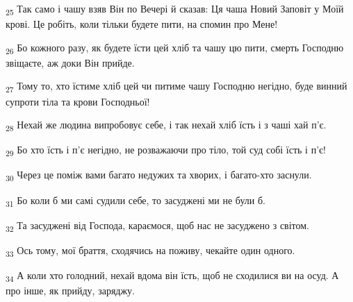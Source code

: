 \begin{tcolorbox}
\textsubscript{25} Так само і чашу взяв Він по Вечері й сказав: Ця чаша Новий Заповіт у Моїй крові. Це робіть, коли тільки будете пити, на спомин про Мене!
\end{tcolorbox}
\begin{tcolorbox}
\textsubscript{26} Бо кожного разу, як будете їсти цей хліб та чашу цю пити, смерть Господню звіщаєте, аж доки Він прийде.
\end{tcolorbox}
\begin{tcolorbox}
\textsubscript{27} Тому то, хто їстиме хліб цей чи питиме чашу Господню негідно, буде винний супроти тіла та крови Господньої!
\end{tcolorbox}
\begin{tcolorbox}
\textsubscript{28} Нехай же людина випробовує себе, і так нехай хліб їсть і з чаші хай п'є.
\end{tcolorbox}
\begin{tcolorbox}
\textsubscript{29} Бо хто їсть і п'є негідно, не розважаючи про тіло, той суд собі їсть і п'є!
\end{tcolorbox}
\begin{tcolorbox}
\textsubscript{30} Через це поміж вами багато недужих та хворих, і багато-хто заснули.
\end{tcolorbox}
\begin{tcolorbox}
\textsubscript{31} Бо коли б ми самі судили себе, то засуджені ми не були б.
\end{tcolorbox}
\begin{tcolorbox}
\textsubscript{32} Та засуджені від Господа, караємося, щоб нас не засуджено з світом.
\end{tcolorbox}
\begin{tcolorbox}
\textsubscript{33} Ось тому, мої браття, сходячись на поживу, чекайте один одного.
\end{tcolorbox}
\begin{tcolorbox}
\textsubscript{34} А коли хто голодний, нехай вдома він їсть, щоб не сходилися ви на осуд. А про інше, як прийду, заряджу.
\end{tcolorbox}

